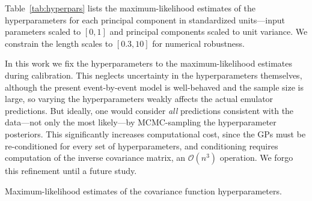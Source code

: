 \documentclass[aps,prc,reprint,superscriptaddress,amsmath]{revtex4-1}
\begin{document}
Table~\ref{tab:hyperpars} lists the maximum-likelihood estimates of the hyperparameters for each principal component in standardized units---input parameters scaled to $[0, 1]$ and principal components scaled to unit variance.
We constrain the length scales to $[0.3, 10]$ for numerical robustness.

In this work we fix the hyperparameters to the maximum-likelihood estimates during calibration.
This neglects uncertainty in the hyperparameters themselves, although the present event-by-event model is well-behaved and the sample size is large, so varying the hyperparameters weakly affects the actual emulator predictions.
But ideally, one would consider \emph{all} predictions consistent with the data---not only the most likely---by MCMC-sampling the hyperparameter posteriors.
This significantly increases computational cost, since the GPs must be re-conditioned for every set of hyperparameters, and conditioning requires computation of the inverse covariance matrix, an $\mathcal O(n^3)$ operation.
We forgo this refinement until a future study.

\begin{table}[t]
  \caption{
    \label{tab:hyperpars}
    Maximum-likelihood estimates of the covariance function hyperparameters.
  }
  
\end{table}





\end{document}
